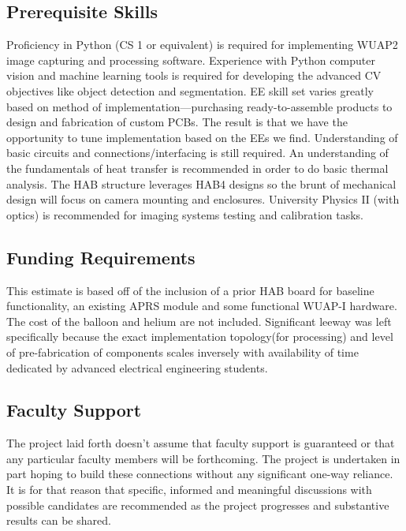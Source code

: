 \documentclass[conference]{IEEEtran} %
\begin{document}
\subsection{Prerequisite Skills}
Proficiency in Python (CS 1 or equivalent) is required for implementing WUAP2 image capturing and processing software. 
Experience with Python computer vision and machine learning tools is required for developing the advanced CV objectives like object detection and segmentation. 
EE skill set varies greatly based on method of implementation---purchasing ready-to-assemble products to design and fabrication of custom PCBs. 
The result is that we have the opportunity to tune implementation based on the EEs we find. 
Understanding of basic circuits and connections/interfacing is still required. 
An understanding of the fundamentals of heat transfer is recommended in order to do basic thermal analysis. 
The HAB structure leverages HAB4 designs so the brunt of mechanical design will focus on camera mounting and enclosures. 
University Physics II (with optics) is recommended for imaging systems testing and calibration tasks.

\subsection{Funding Requirements}


This estimate is based off of the inclusion of a prior HAB board for baseline functionality, an existing APRS module and some functional WUAP-I hardware. 
The cost of the balloon and helium are not included. 
Significant leeway was left specifically because the exact implementation topology(for processing) and level of pre-fabrication of components scales inversely with availability of time dedicated by advanced electrical engineering students.

\subsection{Faculty Support}
The project laid forth doesn't assume that faculty support is guaranteed or that any particular faculty members will be forthcoming. 
The project is undertaken in part hoping to build these connections without any significant one-way reliance. 
It is for that reason that specific, informed and meaningful discussions with possible candidates are recommended as the project progresses and substantive results can be shared.
\end{document}
